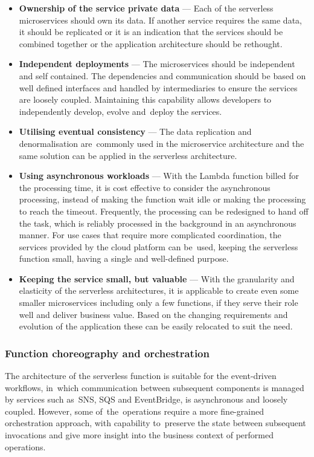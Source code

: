 \begin{itemize}
   \item \textbf{Ownership of the service private data} --- Each of the serverless microservices should own its data. If another service requires the same data, it should be replicated or it is an indication that the services should be combined together or the application architecture should be rethought.
   \item \textbf{Independent deployments} --- The microservices should be independent and self contained. The dependencies and communication should be based on well defined interfaces and handled by intermediaries to ensure the services are loosely coupled. Maintaining this capability allows developers to independently develop, evolve and~deploy the services.
   \item \textbf{Utilising eventual consistency} --- The data replication and denormalisation are~commonly used in the microservice architecture and the same solution can be applied in the serverless architecture.
   \item \textbf{Using asynchronous workloads} ---
   With the Lambda function billed for the processing time, it is cost effective to consider the asynchronous processing, instead of making the function wait idle or making the processing to reach the timeout.
   Frequently, the processing can be redesigned to hand off the task, which is reliably processed in the background in an asynchronous manner.
   For use cases that require more complicated coordination, the services provided by the cloud platform can be~used, keeping the serverless function small, having a single and well-defined purpose.
   \item \textbf{Keeping the service small, but valuable} ---
   With the granularity and elasticity of the serverless architectures, it is applicable to create even some smaller microservices including only a few functions, if they serve their role well and deliver business value.
   Based on the changing requirements and evolution of the application these can be easily relocated to suit the need.
\end{itemize}

\subsubsection{Function choreography and orchestration} \label{chapter:serverless-processing-function-composition-and-orchestration}

The architecture of the serverless function is suitable for the event-driven workflows, in~which communication between subsequent components is managed by services such as~SNS, SQS and EventBridge, is asynchronous and loosely coupled.
However, some of~the~operations require a more fine-grained orchestration approach, with capability to~preserve the state between subsequent invocations and give more insight into the business context of performed operations.

